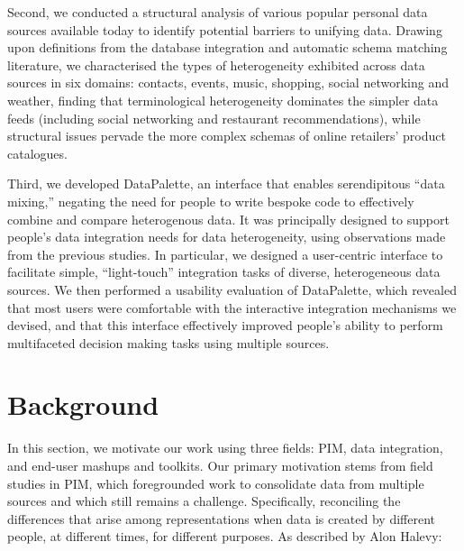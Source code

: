 \documentclass{sigchi}
\begin{document}

Second, we conducted a structural analysis of various popular personal data sources available today to identify potential barriers to unifying data.  Drawing upon definitions from the database integration and automatic schema matching literature, we characterised the types of heterogeneity exhibited across data sources in six domains: contacts, events, music, shopping, social networking and weather, finding that terminological heterogeneity dominates the simpler data feeds (including social networking and restaurant recommendations), while structural issues pervade the more complex schemas of online retailers' product catalogues.


Third, we developed DataPalette, an interface that enables serendipitous ``data mixing,'' negating the need for people to write bespoke code to effectively combine and compare heterogenous data.  It was principally designed to support people's data integration needs for data heterogeneity, using observations made from the previous studies.  In particular, we designed a user-centric interface to facilitate simple, ``light-touch'' integration tasks of diverse, heterogeneous data sources.  We then performed a usability evaluation of DataPalette, which revealed that most users were comfortable with the interactive integration mechanisms we devised, and that this interface effectively improved people's ability to perform multifaceted decision making tasks using multiple sources.

\section{Background}

In this section, we motivate our work using three fields: PIM, data integration, and end-user mashups and toolkits.  Our primary motivation stems from field studies in PIM, which foregrounded work to consolidate data from multiple sources and which still remains a challenge.  Specifically, reconciling the differences that arise among representations when data is created by different people, at different times, for different purposes. As described by Alon Halevy:
\end{document}
